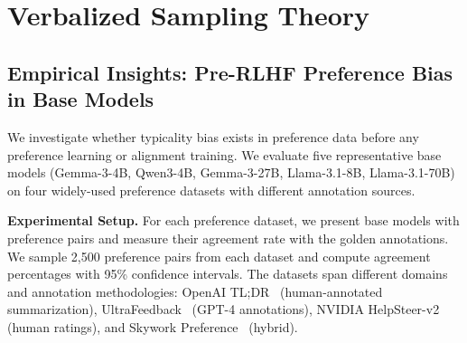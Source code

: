 




\section{Verbalized Sampling Theory}\label{appendix:additional_proof}


\subsection{Empirical Insights: Pre-RLHF Preference Bias in Base Models}\label{appendix:preference_bias_base_model}

  We investigate whether typicality bias exists in preference data before any preference
  learning or alignment training. We evaluate five representative base models (Gemma-3-4B, Qwen3-4B,
  Gemma-3-27B, Llama-3.1-8B, Llama-3.1-70B) on four widely-used preference datasets with different
   annotation sources.

  \textbf{Experimental Setup.} For each preference dataset, we present base models with preference
   pairs and measure their agreement rate with the golden annotations. We sample 2,500 preference
   pairs from each dataset and compute agreement percentages with 95\% confidence intervals. The
  datasets span different domains and annotation methodologies: OpenAI TL;DR~\citep{stienon2020learning} (human-annotated
  summarization), UltraFeedback~\citep{cui2023ultrafeedback} (GPT-4 annotations), NVIDIA HelpSteer-v2~\citep{wang2024helpsteer2} (human ratings), and
  Skywork Preference~\citep{liu2024skywork} (hybrid).

